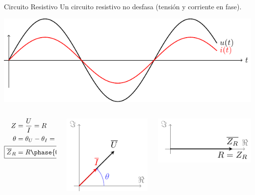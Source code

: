 \documentclass[aspectratio=169, usenames,svgnames,dvipsnames]{beamer}
\begin{document}
\begin{frame}[label={sec:org6e0c09f}]{Circuito Resistivo}
Un circuito resistivo no desfasa (\alert{tensión y corriente en fase}).
\begin{center}
\includegraphics[height=0.3\textheight]{../figs/resistivo.pdf}
\end{center}

\begin{columns}
\begin{column}{0.3\columnwidth}
\begin{align*}
  Z &= \frac{U}{I} = R\\
  \theta &= \theta_U - \theta_I = 0\\
  \Aboxed{\overline{Z}_R &= R \phase{0}}
\end{align*}
\end{column}

\begin{column}{0.35\columnwidth}
\begin{center}
\includegraphics[height=0.35\textheight]{../figs/fasorResistencia_VI.pdf}
\end{center}
\end{column}


\begin{column}{0.35\columnwidth}
\begin{center}
\includegraphics[height=0.25\textheight]{../figs/fasorResistencia.pdf}
\end{center}
\end{column}
\end{columns}
\end{frame}
\end{document}
